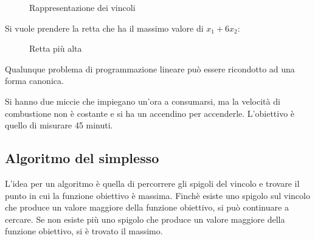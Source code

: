 \documentclass[a4paper]{article}
\begin{document}
\begin{example}
\begin{figure}[H]
    \caption{Rappresentazione dei vincoli}
  \end{figure}
  \noindent
  Si vuole prendere la retta che ha il massimo valore di \( x_1 + 6x_2 \):
  \begin{figure}[H]
    \centering
    \caption{Retta più alta}
  \end{figure}
\end{example}
\begin{theorem}
  Qualunque problema di programmazione lineare può essere ricondotto ad una forma canonica.
\end{theorem}

\begin{exercise}
  Si hanno due miccie che impiegano un'ora a consumarsi, ma la velocità di combustione non è
  costante e si ha un accendino per accenderle. L'obiettivo è quello di misurare 45 minuti.
\end{exercise}

\subsection{Algoritmo del simplesso}
L'idea per un algoritmo è quella di percorrere gli spigoli del vincolo e trovare il
punto in cui la funzione obiettivo è massima. Finchè esiste uno spigolo sul vincolo
che produce un valore maggiore della funzione obiettivo, si può continuare a
cercare. Se non esiste più uno spigolo che produce un valore maggiore della funzione
obiettivo, si è trovato il massimo.
\end{document}
